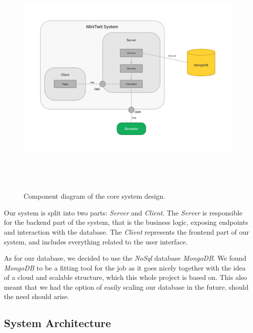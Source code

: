 \begin{figure}[H]
    \centering
    \includegraphics[width=14cm,height=12cm,keepaspectratio]{Diagrams/ComponentDiagram.png}
    \caption{Component diagram of the core system design.}
    \label{ComponentDiagram_1}
\end{figure}

Our system is split into two parts: \textit{Server} and \textit{Client}. The \textit{Server} is responsible for the backend part of the system, that is the business logic, exposing endpoints and interaction with the database. The \textit{Client} represents the frontend part of our system, and includes everything related to the user interface. %

As for our database, we decided to use the \textit{NoSql} database \textit{MongoDB}. We found \textit{MongoDB} to be a fitting tool for the job as it goes nicely together with the idea of a cloud and scalable structure, which this whole project is based on. This also meant that we had the option of easily scaling our database in the future, should the need should arise. 

\subsection{System Architecture}

